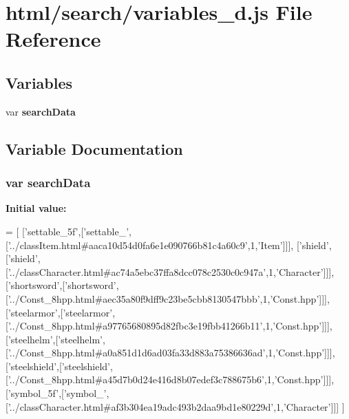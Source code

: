 \section{html/search/variables\-\_\-d.js File Reference}
\label{variables__d_8js}
\subsection*{Variables}
\begin{DoxyCompactItemize}
\item 
var {\bf search\-Data}
\end{DoxyCompactItemize}


\subsection{Variable Documentation}
\subsubsection[{search\-Data}]{\setlength{\rightskip}{0pt plus 5cm}var search\-Data}\label{variables__d_8js_ad01a7523f103d6242ef9b0451861231e}
{\bfseries Initial value\-:}
\begin{DoxyCode}
=
[
  [\textcolor{stringliteral}{'settable\_5f'},[\textcolor{stringliteral}{'settable\_'},[\textcolor{stringliteral}{'../classItem.html#aaca10d54d0fa6e1e090766b81c4a60c9'},1,\textcolor{stringliteral}{'Item'}]]],
  [\textcolor{stringliteral}{'shield'},[\textcolor{stringliteral}{'shield'},[\textcolor{stringliteral}{'../classCharacter.html#ac74a5ebc37ffa8dcc078c2530c0c947a'},1,\textcolor{stringliteral}{'Character'}]]],
  [\textcolor{stringliteral}{'shortsword'},[\textcolor{stringliteral}{'shortsword'},[\textcolor{stringliteral}{'../Const\_8hpp.html#aec35a80f9dff9c23be5cbb8130547bbb'},1,\textcolor{stringliteral}{'Const.hpp'}]]],
  [\textcolor{stringliteral}{'steelarmor'},[\textcolor{stringliteral}{'steelarmor'},[\textcolor{stringliteral}{'../Const\_8hpp.html#a97765680895d82fbc3e19fbb41266b11'},1,\textcolor{stringliteral}{'Const.hpp'}]]],
  [\textcolor{stringliteral}{'steelhelm'},[\textcolor{stringliteral}{'steelhelm'},[\textcolor{stringliteral}{'../Const\_8hpp.html#a0a851d1d6ad03fa33d883a75386636ad'},1,\textcolor{stringliteral}{'Const.hpp'}]]],
  [\textcolor{stringliteral}{'steelshield'},[\textcolor{stringliteral}{'steelshield'},[\textcolor{stringliteral}{'../Const\_8hpp.html#a45d7b0d24e416d8b07edef3c788675b6'},1,\textcolor{stringliteral}{'Const.hpp'}]]],
  [\textcolor{stringliteral}{'symbol\_5f'},[\textcolor{stringliteral}{'symbol\_'},[\textcolor{stringliteral}{'../classCharacter.html#af3b304ea19adc493b2daa9bd1e80229d'},1,\textcolor{stringliteral}{'Character'}]]]
]
\end{DoxyCode}
